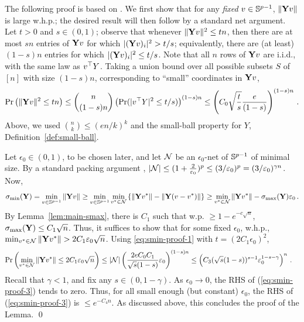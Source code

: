 \documentclass[times,sort&compress,3p]{elsarticle}
\begin{document}
The following proof is based on \cite[Corollary 4.6]{rudelson2013lecture}.
We first show that for any \emph{fixed} $v\in \mathbb{S}^{p-1}$, $\|{\bf Y} v\|$ is large w.h.p.; the desired result will then follow by a standard net argument. Let $t>0$ and $s\in (0,1)$; observe that whenever $\|{\bf Y} v\|^2\le tn$, then there are at most $sn$ entries of ${\bf Y} v$ for which $|({\bf Y} v)_i|^2>t/s$; equivalently, there are (at least) $(1-s)n$ entries for which $|({\bf Y} v)_i|^2 \le t/s$. 
Note that all $n$ rows of ${\bf Y} v$ are i.i.d., with the same law as $v^\top Y$. Taking a union bound over all possible subsets $S$ of $[n]$ with size $(1-s)n$, corresponding to ``small'' coordinates in ${\bf Y} v$, 
\begin{equation}
    \label{eq:smin-proof-1}
    \Pr\left( \|{\bf Y} v\|^2 \le tn \right) \le \binom{n}{(1-s)n}\left( \Pr(|v^\top Y|^2\le t/s) \right)^{(1-s)n} \le \left( C_0 \sqrt{\frac{t}{s}} \frac{e}{(1-s)} \right)^{(1-s)n} \,.
\end{equation}
Above, we used $\binom{n}{k}\le (en/k)^k$ and the small-ball property for $Y$, Definition~\ref{def:small-ball}. 

Let $\epsilon_0\in (0,1)$, to be chosen later, and let $\mathcal{N}$ be an $\epsilon_0$-net of $\mathbb{S}^{p-1}$ of minimal size. By a standard packing argument \cite[Lemma 5.2]{Vershynin}, $|\mathcal{N}|\le (1+\frac{2}{\varepsilon_0})^p \le (3/\varepsilon_0)^p = (3/\varepsilon_0)^{\gamma n}$. Now,
\begin{equation}
    \sigma_{\min}({\bf Y}) = \min_{v\in \mathbb{S}^{p-1}} \|{\bf Y} v\| \ge \min_{v\in \mathbb{S}^{p-1}} \min_{v^*\in \mathcal{N}} \left\{ \|{\bf Y} v^*\| - \|{\bf Y} (v-v^*)\|  \right\} \ge \min_{v^*\in \mathcal{N}} \|{\bf Y} v^*\| - \sigma_{\max}({\bf Y})\varepsilon_0 \,.
\end{equation}
By Lemma~\ref{lem:main-smax}, there is $C_1$ such that w.p. $\ge 1-e^{-c\sqrt{n}}$, $\sigma_{\max}({\bf Y})\le C_1\sqrt{n}$. Thus, it suffices to show that for some fixed $\epsilon_0$, w.h.p.,  $\min_{v^*\in \mathcal{N}} \|{\bf Y} v^*\| > 2C_1 \varepsilon_0\sqrt{n}$. Using \eqref{eq:smin-proof-1} with $t=(2C_1\epsilon_0)^2$,
\begin{equation}
\label{eq:smin-proof-3}
    \begin{split}
        \Pr\left( \min_{v^*\in \mathcal{N}}\|{\bf Y} v^*\| \le 2C_1\varepsilon_0 \sqrt{n} \right) 
        &\le |\mathcal{N}| \left(  \frac{2e C_0C_1}{\sqrt{s}(1-s)} \varepsilon_0 \right)^{(1-s)n} 
        \le \left( C_3 (\sqrt{s}(1-s))^{s-1} \varepsilon_0^{1-s-\gamma} \right)^n \,.
    \end{split}
\end{equation}
Recall that $\gamma<1$, and fix any $s\in (0,1-\gamma)$. As $\epsilon_0\to 0$, the RHS of (\ref{eq:smin-proof-3}) tends to zero. Thus, for all small enough (but constant) $\epsilon_0$, the RHS of (\ref{eq:smin-proof-3}) is $\le e^{-C_4 n}$. As discussed above, this concludes the proof of the Lemma.
\qed
\end{document}
